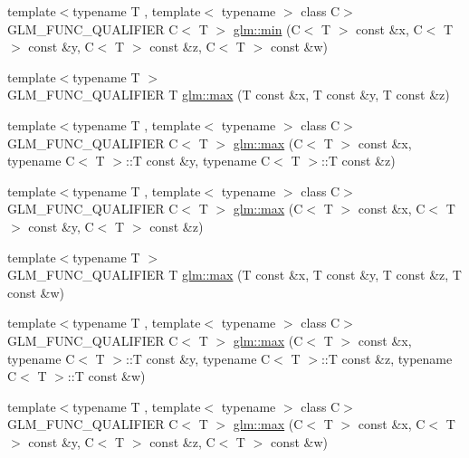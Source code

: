 \begin{DoxyCompactItemize}
\item 
{\footnotesize template$<$typename T , template$<$ typename $>$ class C$>$ }\\G\-L\-M\-\_\-\-F\-U\-N\-C\-\_\-\-Q\-U\-A\-L\-I\-F\-I\-E\-R C$<$ T $>$ \hyperlink{group__gtx__extented__min__max_ga7471ea4159eed8dd9ea4ac5d46c2fead}{glm\-::min} (C$<$ T $>$ const \&x, C$<$ T $>$ const \&y, C$<$ T $>$ const \&z, C$<$ T $>$ const \&w)
\item 
{\footnotesize template$<$typename T $>$ }\\G\-L\-M\-\_\-\-F\-U\-N\-C\-\_\-\-Q\-U\-A\-L\-I\-F\-I\-E\-R T \hyperlink{group__gtx__extented__min__max_ga04991ccb9865c4c4e58488cfb209ce69}{glm\-::max} (T const \&x, T const \&y, T const \&z)
\item 
{\footnotesize template$<$typename T , template$<$ typename $>$ class C$>$ }\\G\-L\-M\-\_\-\-F\-U\-N\-C\-\_\-\-Q\-U\-A\-L\-I\-F\-I\-E\-R C$<$ T $>$ \hyperlink{group__gtx__extented__min__max_gae1b7bbe5c91de4924835ea3e14530744}{glm\-::max} (C$<$ T $>$ const \&x, typename C$<$ T $>$\-::T const \&y, typename C$<$ T $>$\-::T const \&z)
\item 
{\footnotesize template$<$typename T , template$<$ typename $>$ class C$>$ }\\G\-L\-M\-\_\-\-F\-U\-N\-C\-\_\-\-Q\-U\-A\-L\-I\-F\-I\-E\-R C$<$ T $>$ \hyperlink{group__gtx__extented__min__max_gaf832e9d4ab4826b2dda2fda25935a3a4}{glm\-::max} (C$<$ T $>$ const \&x, C$<$ T $>$ const \&y, C$<$ T $>$ const \&z)
\item 
{\footnotesize template$<$typename T $>$ }\\G\-L\-M\-\_\-\-F\-U\-N\-C\-\_\-\-Q\-U\-A\-L\-I\-F\-I\-E\-R T \hyperlink{group__gtx__extented__min__max_ga78e04a0cef1c4863fcae1a2130500d87}{glm\-::max} (T const \&x, T const \&y, T const \&z, T const \&w)
\item 
{\footnotesize template$<$typename T , template$<$ typename $>$ class C$>$ }\\G\-L\-M\-\_\-\-F\-U\-N\-C\-\_\-\-Q\-U\-A\-L\-I\-F\-I\-E\-R C$<$ T $>$ \hyperlink{group__gtx__extented__min__max_ga7cca8b53cfda402040494cdf40fbdf4a}{glm\-::max} (C$<$ T $>$ const \&x, typename C$<$ T $>$\-::T const \&y, typename C$<$ T $>$\-::T const \&z, typename C$<$ T $>$\-::T const \&w)
\item 
{\footnotesize template$<$typename T , template$<$ typename $>$ class C$>$ }\\G\-L\-M\-\_\-\-F\-U\-N\-C\-\_\-\-Q\-U\-A\-L\-I\-F\-I\-E\-R C$<$ T $>$ \hyperlink{group__gtx__extented__min__max_gaacffbc466c2d08c140b181e7fd8a4858}{glm\-::max} (C$<$ T $>$ const \&x, C$<$ T $>$ const \&y, C$<$ T $>$ const \&z, C$<$ T $>$ const \&w)
\end{DoxyCompactItemize}


